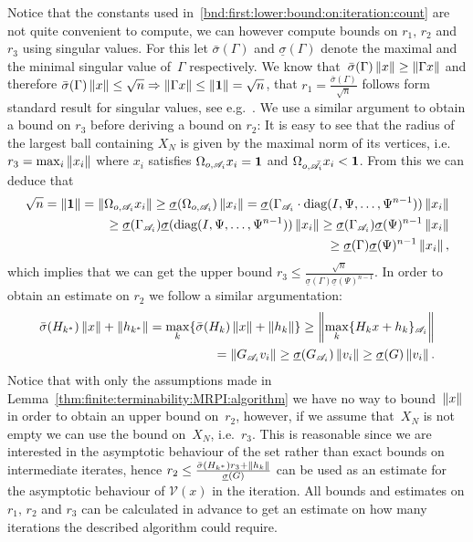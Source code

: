 %
Notice that the constants used in~\eqref{bnd:first:lower:bound:on:iteration:count} are not
quite convenient to compute, we can however compute bounds on $r_1,\, r_2$ and $r_3$ using 
singular values.
%
For this let $\bar\sigma(\Gamma)$ and $\underline\sigma(\Gamma)$ denote the maximal and the minimal
singular value of~$\Gamma$ respectively.
%
We know that~$\bar\sigma(\Gamma)\left\|x\right\|\geq\left\|\Gamma x\right\|$ and therefore $\bar\sigma(\Gamma)\left\|x\right\|
\leq \sqrt{n}\Rightarrow \left\|\Gamma x\right\|\leq\left\|\bf{1}\right\|=\sqrt{n}$, that $r_1=\frac{\bar\sigma(\Gamma)}{\sqrt{n}}$
follows form standard result for singular values, see e.g.~\cite{Golub:1996}.
%
We use a similar argument to obtain a bound on $r_3$ before deriving a bound on $r_2$:
%
It is easy to see that the radius of the largest ball containing $X_N$ is given by the maximal
norm of its vertices, i.e. $r_3=\max_{i}\left\|x_i\right\|$ where $x_i$ satisfies $\Omega_{o,\mathscr{A}_i} x_i={\bf{1}}$
and $\Omega_{o,\bar{\mathscr A}_i}x_i<{\bf{1}}$.
%
From this we can deduce that
%
\begin{equation}\begin{split}
	\sqrt{n}=\left\|\bf{1}\right\|=\left\|\Omega_{o,\mathscr{A}_i}x_i\right\|\geq\underline\sigma(\Omega_{o,\mathscr{A}_i})\left\|x_i\right\|
	=\underline\sigma(\Gamma_{\mathscr{A}_i}\cdot \text{diag}(I,\Psi,\dots,\Psi^{n-1}))\left\|x_i\right\|\\
	\geq\underline\sigma(\Gamma_{\mathscr{A}_i})\underline\sigma( \text{diag}(I,\Psi,\dots,\Psi^{n-1}))\left\|x_i\right\|
	\geq\underline\sigma(\Gamma_{\mathscr{A}_i})\underline\sigma(\Psi)^{n-1}\left\|x_i\right\|\\
	\geq\underline\sigma(\Gamma)\underline\sigma(\Psi)^{n-1}\left\|x_i\right\|,
\end{split}\end{equation}
%
which implies that we can get the upper bound $r_3\leq\frac{\sqrt{n}}{\underline\sigma(\Gamma)
\underline\sigma(\Psi)^{n-1}}$.
%
In order to obtain an estimate on $r_2$ we follow a similar argumentation:
%
\begin{equation}\begin{split}
	\bar\sigma(H_{k^\ast})\left\|x\right\|+\left\|h_{k^\ast}\right\|=\max_k\{\bar\sigma(H_k)\left\|x\right\|+\left\|h_k\right\|\}\geq
	\left\|\max_k\{H_k x + h_k\}_{\mathscr{A}_i}\right\|\\ 
	=\left\|G_{\mathscr{A}_i}v_i\right\| \geq\underline\sigma(G_{\mathscr A_i})\left\|v_i\right\|
	\geq\underline\sigma(G)\left\|v_i\right\|.
\end{split}\end{equation}
%
Notice that with only the assumptions made in Lemma~\ref{thm:finite:terminability:MRPI:algorithm}
we have no way to bound~$\left\|x\right\|$ in order to obtain an upper bound on~$r_2$,
however, if we assume that~$X_N$ is not empty we can use the bound on~$X_N$, i.e.~$r_3$.
%
This is reasonable since we are interested in the asymptotic behaviour of the set rather than
exact bounds on intermediate iterates, hence $r_2\leq\frac{\bar\sigma(H_{k^\ast})r_3+\left\|h_k\right\|}
{\underline\sigma(G)}$ can be used as an estimate for the asymptotic behaviour of $\mathcal V(x)$
in the iteration.
%
All bounds and estimates on $r_1,\,r_2$ and $r_3$ can be calculated in advance to get an estimate
on how many iterations the described algorithm could require.
%
%
%
%
